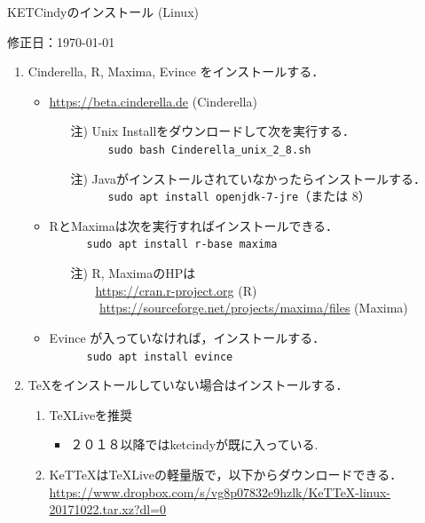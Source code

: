 \documentclass{ujarticle}
\begin{document}
\begin{center}
KETCindyのインストール (Linux)
\end{center}

\hfill 修正日：\today

\begin{enumerate}[\bf\large 1.]
\item Cinderella, R, Maxima, Evince をインストールする．
 \begin{itemize}
 \item \url{https://beta.cinderella.de}  (Cinderella)
    \begin{itemize}
    \item[注)]Unix Installをダウンロードして次を実行する．\\
　　　\verb|sudo bash Cinderella_unix_2_8.sh|
    \item[注)]Javaがインストールされていなかったらインストールする．\\
　　　\verb|sudo apt install openjdk-7-jre|（または 8）
    \end{itemize}
    \item RとMaximaは次を実行すればインストールできる．\\
　　　\verb|sudo apt install r-base maxima|
    \begin{itemize}
    \item[注)]R, MaximaのHPは\\
 　　\url{https://cran.r-project.org}   (R)\\
　　 \url{https://sourceforge.net/projects/maxima/files}  (Maxima)
    \end{itemize}
 \item Evince が入っていなければ，インストールする．\\
　　　\verb|sudo apt install evince|
 \end{itemize}

\item \TeX をインストールしていない場合はインストールする．
 \begin{enumerate}[(1)]
 \item TeXLiveを推奨
    \begin{itemize}
    \item ２０１８以降ではketcindyが既に入っている.
    \end{itemize}
\item KeTTeXはTeXLiveの軽量版で，以下からダウンロードできる．\\
    \hspace*{6mm}\url{https://www.dropbox.com/s/vg8p07832e9hzlk/KeTTeX-linux-20171022.tar.xz?dl=0}
 \end{enumerate}


\end{enumerate}
\end{document}
